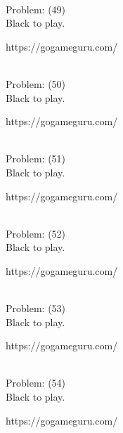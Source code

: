 \documentclass[11pt]{article}
\begin{document}
\begin{minipage}[t]{0.5\textwidth}
  {\centering
  
\\
  Problem: (49)\\
  Black to play.

https://gogameguru.com/\\
  }
\end{minipage}
\begin{minipage}[t]{0.5\textwidth}
  {\centering
  
\\
  Problem: (50)\\
  Black to play.

https://gogameguru.com/\\
  }
\end{minipage}
\begin{minipage}[t]{0.5\textwidth}
  {\centering
  
\\
  Problem: (51)\\
  Black to play.

https://gogameguru.com/\\
  }
\end{minipage}
\begin{minipage}[t]{0.5\textwidth}
  {\centering
  
\\
  Problem: (52)\\
  Black to play.

https://gogameguru.com/\\
  }
\end{minipage}
\begin{minipage}[t]{0.5\textwidth}
  {\centering
  
\\
  Problem: (53)\\
  Black to play.

https://gogameguru.com/\\
  }
\end{minipage}
\begin{minipage}[t]{0.5\textwidth}
  {\centering
  
\\
  Problem: (54)\\
  Black to play.

https://gogameguru.com/\\
  }
\end{minipage}
\end{document}
